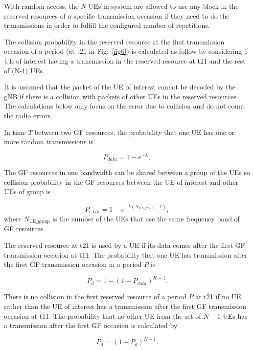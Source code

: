 \documentclass{ieeeaccess}
\begin{document}
With random access, the $N$ UEs in system are allowed to use any block in the reserved resources of a specific transmission occasion if they need to do the transmissions in order to fulfill the configured number of repetitions.

The collision probability in the reserved resource at the first transmission occasion of a period (at t21 in Fig.~\ref{fig6}) is calculated as follow by considering 1 UE of interest having a transmission in the reserved resource at t21 and the rest of (N-1) UEs.

It is assumed that the packet of the UE of interest cannot be decoded by the gNB if there is a collision with packets of other UEs in the reserved resources. The calculations below only focus on the error due to collision and do not count the radio errors.

In time $T$ between two GF resources, the probability that one UE has one or more random transmissions is

\begin{equation}
P_{data} = 1 - e^{-\lambda},\label{eq1}
\end{equation}

The GF resources in one bandwidth can be shared between a group of the UEs so collision probability in the GF resources between the UE of interest and other UEs of group is 

\begin{equation}
P_{c\_GF} = 1 - e^{-\lambda(N_\mathrm{UE\_group}-1)},\label{eq2}
\end{equation}
where $N_\mathrm{UE\_group}$ is the number of the UEs that use the same frequency band of GF resources.

The reserved resource at t21 is used by a UE if its data comes after the first GF transmission occasion at t11. The probability that one UE has transmission after the first GF transmission occasion in a period $P$ is 

\begin{equation}
P_{d} = 1 - (1-P_{data})^{K-1}.\label{eq3}
\end{equation}

There is no collision in the first reserved resource of a period $P$ at t21 if no UE rather than the UE of interest has a transmission after the first GF transmission occasion at t11. The probability that no other UE from the set of $N-1$ UEs has a transmission after the first GF occasion is calculated by 

\begin{equation}
P_{0} = (1-P_{d})^{N-1}.\label{eq4}
\end{equation}
\end{document}
